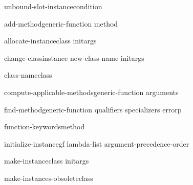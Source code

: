 \documentclass[10pt,english]{book}
\begin{document}
\begin{function}{unbound-slot-instance}{condition}
  
\end{function}

\begin{generic}{add-method}{generic-function method}
  
\end{generic}

\begin{generic}{allocate-instance}{class \rest initargs}
  
\end{generic}

\begin{generic}{change-class}{instance new-class-name \rest initargs \akeys}
  
\end{generic}

\begin{generic}{class-name}{class}
  
\end{generic}

\begin{generic}{compute-applicable-methods}{generic-function arguments}
  
\end{generic}

\begin{generic}{find-method}{generic-function qualifiers specializers \op errorp}
  
\end{generic}

\begin{generic}{function-keywords}{method}
  
\end{generic}

\begin{generic}{initialize-instance}{gf \key lambda-list argument-precedence-order \akeys}
  
\end{generic}

\begin{generic}{make-instance}{class \rest initargs \akeys}
  
\end{generic}

\begin{generic}{make-instances-obsolete}{class}
  
\end{generic}
\end{document}
